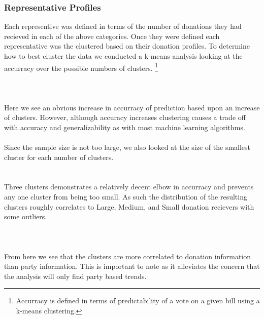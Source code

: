 \documentclass[journal]{IEEEtran}
\begin{document}
\subsubsection{Representative Profiles}
Each representive was defined in terms of the number of donations they had recieved in each of the above
categories. Once they were defined each representative was the clustered based on their donation profiles.
To determine how to best cluster the data we conducted a k-means analysis looking at the accurracy over the 
possible numbers of clusters.
\footnote{Accurracy is defined in terms of predictability of a vote on a given bill using a k-means clustering.}\\\\
\\
\\Here we see an obvious increase in accurracy of prediction based upon an increase of clusters. However, although accuracy increases
clustering causes a trade off with accuracy and generalizability as with most machine learning algorithms.\\\\
Since the sample size is not too large, we also looked at the size of the smallest cluster for each number of clusters.\\
\\
\\Three clusters demonstrates a relatively decent elbow in accurracy and prevents any one cluster from being too small. As such
the distribution of the resulting clusters roughly correlates to Large, Medium, and Small donation recievers with some outliers.\\\\
\\\\
From here we see that the clusters are more correlated to donation information than party information. This is important to note
as it alleviates the concern that the analysis will only find party based trends.
\end{document}
